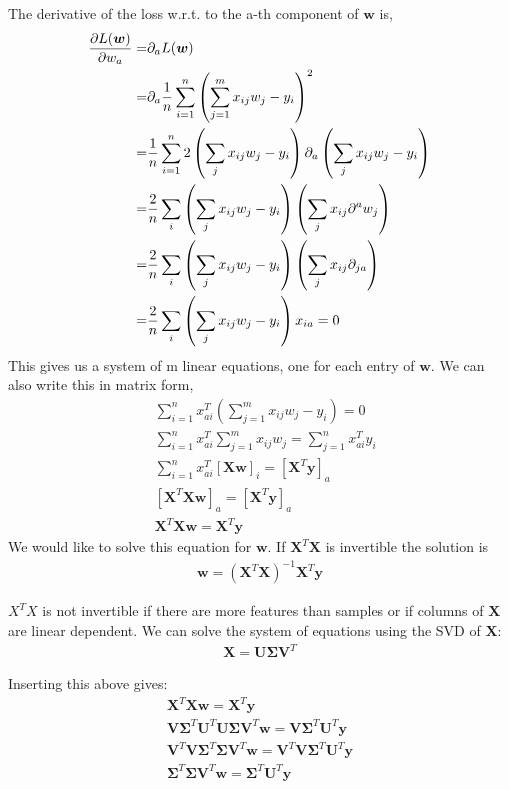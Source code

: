 The derivative of the loss w.r.t. to the a-th component of $\bm{w}$ is,
\begin{align}
    \pdv{L(\bm{w})}{w_{a}} =& \partial_a L(\bm{w}) \\
    =&\partial_a \frac{1}{n} \sum_{i=1}^{n}\left(\sum_{j=1}^{m}x_{ij}w_{j}-y_{i}\right)^2\\
    =&\frac{1}{n}\sum_{i=1}^{n}2\left(\sum_{j}x_{ij}w_{j}-y_{i}\right)\partial_a \left(\sum_{j}x_{ij}w_{j}-y_{i}\right)\\
    =&\frac{2}{n}\sum_{i} \left(\sum_{j}x_{ij}w_{j}-y_{i}\right)\left(\sum_{j}x_{ij}\partial^a w_{j}\right)\\
    =&\frac{2}{n}\sum_{i} \left(\sum_{j}x_{ij}w_{j}-y_{i}\right)\left(\sum_{j}x_{ij}\partial_{ja}\right)\\
    =&\frac{2}{n} \sum_{i}\left(\sum_{j}x_{ij}w_{j}-y_{i}\right)x_{ia}= 0
\end{align}
This gives us a system of m linear equations, one for each entry of $\bm{w}$.
We can also write this in matrix form,
\begin{align}
    &\sum_{i=1}^{n} x_{ai}^T\left(\sum_{j=1}^{m}x_{ij}w_{j}-y_{i}\right)=0 \\
    &\sum_{i=1}^{n} x_{ai}^T \sum_{j=1}^{m} x_{ij} w_{j} = \sum_{j=1}^{n}x_{ai}^T y_{i}\\
    &\sum_{i=1}^{n} x_{ai}^T [\bm{Xw}]_i = [\bm{X}^T\bm{y}]_a\\
    &[\bm{X}^T\bm{Xw}]_a = [\bm{X}^T\bm{y}]_a\\
    &\bm{X}^T\bm{Xw}  = \bm{X}^T\bm{y}
\end{align}
We would like to solve this equation for $\bm{w}$.
If $\bm{X}^T\bm{X}$ is invertible the solution is 
\begin{align}
    \bm{w}=(\bm{X}^T\bm{X})^{-1} \bm{X}^T \bm{y}
\end{align}

$X^T X$ is not invertible if there are more features than samples or if columns of $\bm{X}$ are linear dependent. 
We can solve the system of equations using the SVD of $\bm{X}$:
\begin{align}
    \bm{X}=\bm{U\Sigma V}^T    
\end{align}

Inserting this above gives:
\begin{align}
    \bm{X}^T\bm{Xw}  = \bm{X}^T\bm{y} \\
    \bm{V}\bm{\Sigma}^T \bm{U}^T \bm{U\Sigma V}^T \bm{w}  = \bm{V\Sigma}^T\bm{U}^T \bm{y} \\
    \bm{V}^T\bm{V}\bm{\Sigma}^T \bm{\Sigma V}^T \bm{w}  = \bm{V}^T\bm{V\Sigma}^T\bm{U}^T \bm{y} \\
    \bm{\Sigma}^T \bm{\Sigma V}^T \bm{w}  = \bm{\Sigma}^T\bm{U}^T \bm{y} \\
\end{align}

